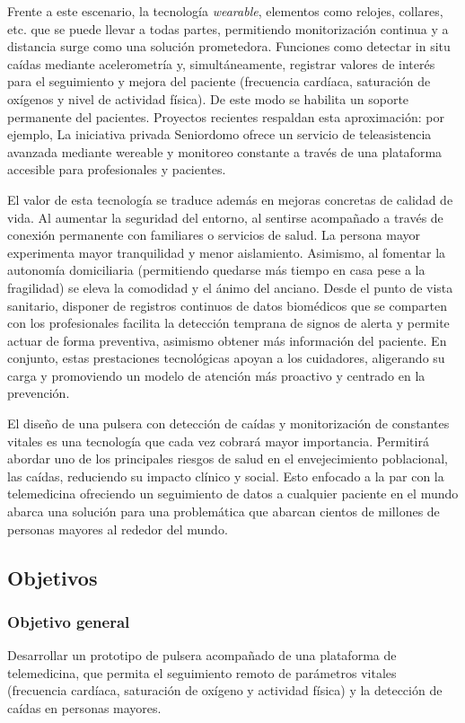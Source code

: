 \documentclass[12pt, a4paper]{article}
\begin{document}
    Frente a este escenario, la tecnología \emph{wearable}, elementos como relojes, collares, etc. que se puede llevar a todas partes, permitiendo monitorización continua y a distancia surge como una solución prometedora. Funciones como detectar in situ caídas mediante acelerometría y, simultáneamente, registrar valores de interés para el seguimiento y mejora del paciente (frecuencia cardíaca, saturación de oxígenos y nivel de actividad física). De este modo se habilita un soporte permanente del pacientes. Proyectos recientes respaldan esta aproximación: por ejemplo, La iniciativa privada Seniordomo ofrece un servicio de teleasistencia avanzada mediante wereable y monitoreo constante a través de una plataforma accesible para profesionales y pacientes\cite{seniordomo}. 
    
    El valor de esta tecnología se traduce además en mejoras concretas de calidad de vida. Al aumentar la seguridad del entorno, al sentirse acompañado a través de conexión permanente con familiares o servicios de salud. La persona mayor experimenta mayor tranquilidad y menor aislamiento\cite{Reina2024}. Asimismo, al fomentar la autonomía domiciliaria (permitiendo quedarse más tiempo en casa pese a la fragilidad) se eleva la comodidad y el ánimo del anciano\cite{Reina2024}. Desde el punto de vista sanitario, disponer de registros continuos de datos biomédicos que se comparten con los profesionales facilita la detección temprana de signos de alerta y permite actuar de forma preventiva, asimismo obtener más información del paciente. En conjunto, estas prestaciones tecnológicas apoyan a los cuidadores, aligerando su carga y promoviendo un modelo de atención más proactivo y centrado en la prevención.
    
    El diseño de una pulsera con detección de caídas y monitorización de constantes vitales es una tecnología que cada vez cobrará mayor importancia. Permitirá abordar uno de los principales riesgos de salud en el envejecimiento poblacional, las caídas, reduciendo su impacto clínico y social. Esto enfocado a la par con la telemedicina ofreciendo un seguimiento de datos a cualquier paciente en el mundo abarca una solución para una problemática que abarcan cientos de millones de personas mayores al rededor del mundo.

	\subsection{Objetivos}
	
	\subsubsection{Objetivo general}
	Desarrollar un prototipo de pulsera acompañado de una plataforma de telemedicina, que permita el seguimiento remoto de parámetros vitales (frecuencia cardíaca, saturación de oxígeno y actividad física) y la detección de caídas en personas mayores.
	
\end{document}
